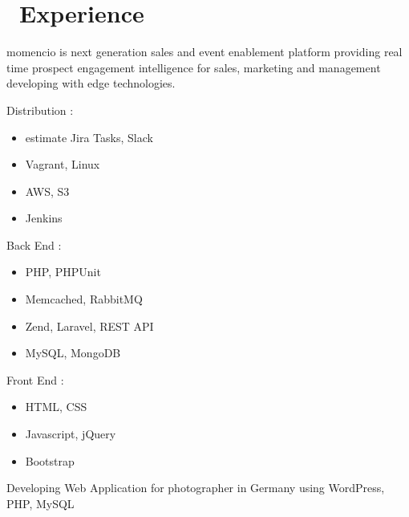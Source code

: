 \documentclass{resume}
\begin{document}



\section{\faUsers\ Experience}
momencio is next generation sales and event enablement platform providing real time prospect engagement intelligence for sales, marketing and management developing with edge technologies.
\begin{multicols}{3}
Distribution :
\begin{itemize}
  \item estimate Jira Tasks, Slack
  \item Vagrant, Linux
  \item AWS, S3
  \item Jenkins
\end{itemize}

\columnbreak

Back End :
\begin{itemize}
  \item PHP, PHPUnit
  \item Memcached, RabbitMQ
  \item Zend, Laravel, REST API
  \item MySQL, MongoDB
\end{itemize}

\columnbreak

Front End :
\begin{itemize}
  \item HTML, CSS
  \item Javascript, jQuery
  \item Bootstrap
\end{itemize}
\end{multicols}

Developing Web Application for photographer in Germany using WordPress, PHP, MySQL
\end{document}
